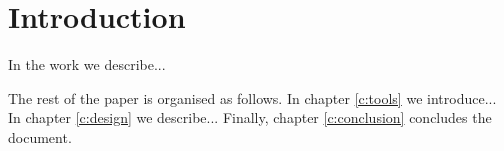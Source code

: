 \chapter{Introduction}\label{c:introduction}

In the work we describe...

The rest of the paper is organised as follows. In chapter \ref{c:tools} we introduce... In chapter \ref{c:design} we describe...
Finally, chapter \ref{c:conclusion} concludes the document.
